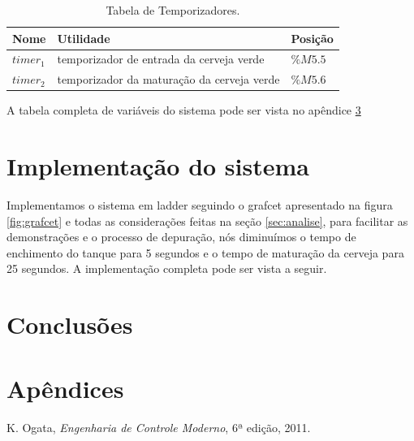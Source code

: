 \documentclass[12pt]{article}
\begin{document}
\begin{table}[H]
	\caption{Tabela de Temporizadores.}
	\centering
	\begin{tabular}{|  p{2cm} | p{10cm} | p{2cm} | }
		\hline
		Nome & Utilidade & Posição\\
		\hline
		$timer_1$ &  temporizador de entrada da cerveja verde & $\%M5.5$ \\
		$timer_2$ & temporizador da maturação da cerveja verde & $\%M5.6$ \\
		 \hline
	\end{tabular}
\end{table}

A tabela completa de variáveis do sistema pode ser vista no apêndice \ref{apx:table}

\section {Implementação do sistema}
\label{sec:ladder}
Implementamos o sistema em ladder seguindo o grafcet apresentado na figura \ref{fig:grafcet} e todas as considerações feitas na seção \ref{sec:analise}, para facilitar as demonstrações e o processo de depuração, nós diminuímos o tempo de enchimento do tanque para 5 segundos e o tempo de maturação da cerveja para 25 segundos. A implementação completa pode ser vista a seguir.



\section {Conclusões}
\newpage
\appendix
\section{Apêndices}

\label{apx:table}


\label{apx:ihm}


\begin{thebibliography}{5}
	
	 K. Ogata, \emph{Engenharia de Controle Moderno}, 6ª edição, 2011.
	
\end{thebibliography}
\end{document}
